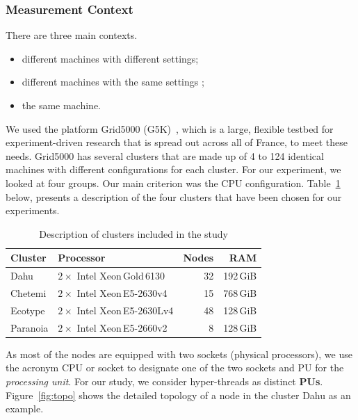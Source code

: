 \subsubsection{Measurement Context}
There are three main contexts.
\begin{itemize}
    \item different machines with different settings;
    \item different machines with the same settings ;
    \item the same machine.
\end{itemize}

We used the platform Grid5000 (G5K)~\cite{grid5000,margery:hal-00965708}, which is a large, flexible testbed for experiment-driven research that is spread out across all of France, to meet these needs. Grid5000 has several clusters that are made up of 4 to 124 identical machines with different configurations for each cluster. For our experiment, we looked at four groups. Our main criterion was the CPU configuration.
Table~\ref{table:g5k}  below, presents a description of the four clusters that have been chosen for our experiments.

\begin{table}[hbt]
    \centering
    \caption{Description of clusters included in the study}
    \label{table:g5k}
    \small
    \begin{tabular}{|l|l|r|r|}
        \hline
        \textbf{Cluster}  & \textbf{Processor}               & \textbf{Nodes} & \textbf{RAM} \\
        \hline
        \hline
        \textsf{Dahu}     & $2\times$ Intel Xeon\,Gold\,6130 & 32             & 192\,GiB     \\
        \hline
        \textsf{Chetemi}  & $2\times$ Intel Xeon\,E5-2630v4  & 15             & 768\,GiB     \\
        \hline
        \textsf{Ecotype}  & $2\times$ Intel Xeon\,E5-2630Lv4 & 48             & 128\,GiB     \\
        \hline
        \textsf{Paranoia} & $2\times$ Intel Xeon\,E5-2660v2  & 8              & 128\,GiB     \\
        \hline
    \end{tabular}
\end{table}

As most of the nodes are equipped with two sockets (physical processors), we use the acronym \textsf{CPU} or \textsf{socket} to designate one of the two sockets and \textsf{PU} for the \emph{processing unit}.
For our study, we consider hyper-threads as distinct \textbf{PUs}.
Figure~\ref{fig:topo} shows the detailed topology of a node in the cluster \textsf{Dahu} as an example.

